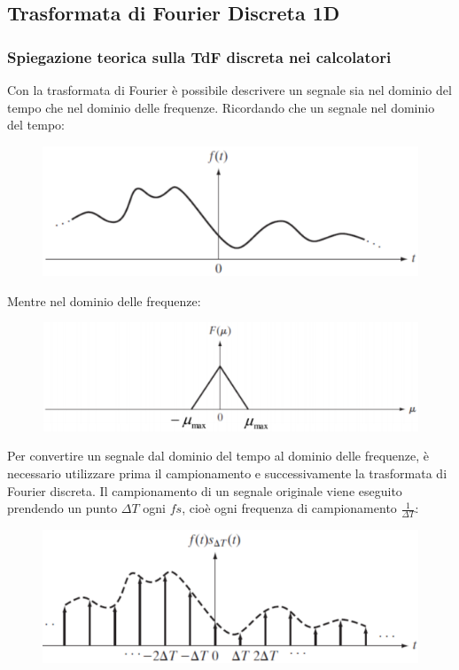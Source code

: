 \documentclass[a4paper]{article}
\begin{document}
	\subsection{Trasformata di Fourier Discreta 1D}
	
	\subsubsection{Spiegazione teorica sulla TdF discreta nei calcolatori}
	
	Con la trasformata di Fourier è possibile descrivere un segnale sia nel dominio del tempo che nel dominio delle frequenze. Ricordando che un segnale nel dominio del tempo:
	\begin{figure}[!htp]
		\centering
		\includegraphics[width=\textwidth]{img/lab/dominio_del_tempo.png}
	\end{figure}
	
	\noindent
	Mentre nel dominio delle frequenze:
	\begin{figure}[!htp]
		\centering
		\includegraphics[width=\textwidth]{img/lab/dominio_delle_frequenze.png}
	\end{figure}
	
	\noindent
	Per convertire un segnale dal dominio del tempo al dominio delle frequenze, è necessario utilizzare prima il campionamento e successivamente la trasformata di Fourier discreta. Il campionamento di un segnale originale viene eseguito prendendo un punto $\Delta T$ ogni $fs$, cioè ogni frequenza di campionamento $\frac{1}{\Delta T}$:
	\begin{figure}[!htp]
		\centering
		\includegraphics[width=\textwidth]{img/lab/campionamento.png}
	\end{figure}\newpage
	
\end{document}
